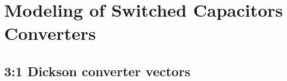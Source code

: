 \chapter{Modeling of Switched Capacitors Converters}

\section{3:1 Dickson converter vectors}
\label{apx:31_dick_charge_flows}


